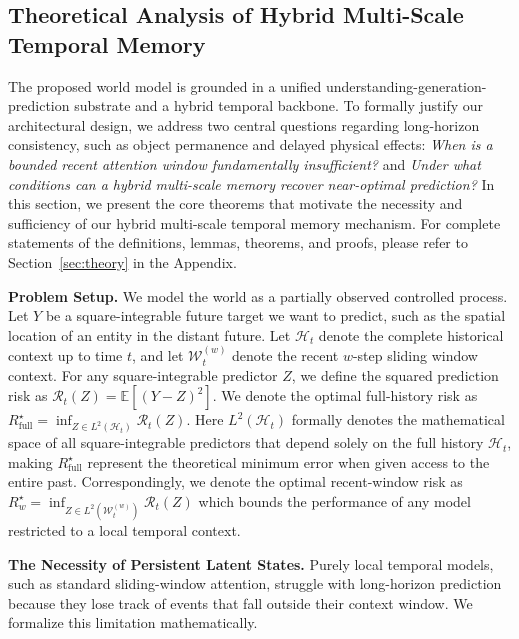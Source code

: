 
\subsection{Theoretical Analysis of Hybrid Multi-Scale Temporal Memory}



The proposed world model is grounded in a unified understanding-generation-prediction substrate and a hybrid temporal backbone. To formally justify our architectural design, we address two central questions regarding long-horizon consistency, such as object permanence and delayed physical effects: \textit{When is a bounded recent attention window fundamentally insufficient?} and \textit{Under what conditions can a hybrid multi-scale memory recover near-optimal prediction?} In this section, we present the core theorems that motivate the necessity and sufficiency of our hybrid multi-scale temporal memory mechanism. For complete statements of the definitions, lemmas, theorems, and proofs, please refer to Section~\ref{sec:theory} in the Appendix.

\textbf{Problem Setup.} 
We model the world as a partially observed controlled process. Let $Y$ be a square-integrable future target we want to predict, such as the spatial location of an entity in the distant future. Let $\mathcal{H}_t$ denote the complete historical context up to time $t$, and let $\mathcal{W}_t^{(w)}$ denote the recent $w$-step sliding window context. For any square-integrable predictor $Z$, we define the squared prediction risk as $\mathcal{R}_t(Z) = \mathbb{E}[(Y-Z)^2]$. We denote the optimal full-history risk as $R_{\mathrm{full}}^\star = \inf_{Z \in L^2(\mathcal{H}_t)} \mathcal{R}_t(Z)$. Here $L^2(\mathcal{H}_t)$ formally denotes the mathematical space of all square-integrable predictors that depend solely on the full history $\mathcal{H}_t$, making $R_{\mathrm{full}}^\star$ represent the theoretical minimum error when given access to the entire past. Correspondingly, we denote the optimal recent-window risk as $R_{w}^\star = \inf_{Z \in L^2(\mathcal{W}_t^{(w)})} \mathcal{R}_t(Z)$ which bounds the performance of any model restricted to a local temporal context.



\textbf{The Necessity of Persistent Latent States.}
Purely local temporal models, such as standard sliding-window attention, struggle with long-horizon prediction because they lose track of events that fall outside their context window. We formalize this limitation mathematically.

